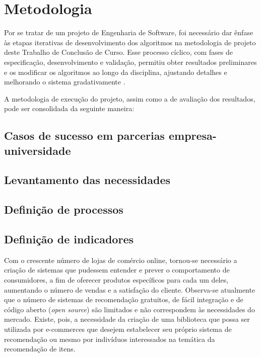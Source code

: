 \chapter[Metodologia]{Metodologia}
\label{chap:metodologia}

Por se tratar de um projeto de Engenharia de Software, foi necessário dar ênfase às etapas iterativas de desenvolvimento dos algoritmos na metodologia de projeto deste Trabalho de Conclusão de Curso. Esse processo cíclico, com fases de especificação, desenvolvimento e validação, permitiu obter resultados preliminares e os modificar os algoritmos ao longo da disciplina, ajustando detalhes e melhorando o sistema gradativamente \cite{iterative-development}.

A metodologia de execução do projeto, assim como a de avaliação dos resultados, pode ser consolidada da seguinte maneira: 

\section{Casos de sucesso em parcerias empresa-universidade} %
\label{sec:cases}


\section{Levantamento das necessidades} %
\label{sec:necessidades}


\section{Definição de processos} %
\label{sec:processos}


\section{Definição de indicadores} %
\label{sec:indicadores}

Com o crescente número de lojas de comércio online, tornou-se necessário a criação de sistemas que pudessem entender e prever o comportamento de consumidores, a fim de oferecer produtos específicos para cada um deles, aumentando o número de vendas e a satisfação do cliente. Observa-se atualmente que o número de sistemas de recomendação gratuitos, de fácil integração e de código aberto (\textit{open source}) são limitados e não correspondem às necessidades do mercado. Existe, pois, a necessidade da criação de uma biblioteca que possa ser utilizada por e-commerces que desejem estabelecer seu próprio sistema de recomendação ou mesmo por indivíduos interessados na temática da recomendação de itens.

